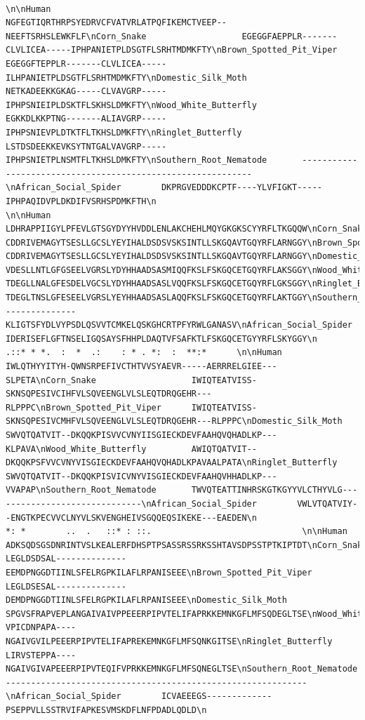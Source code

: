 \documentclass[
  letterpaper,
  DIV=11,
  numbers=noendperiod]{scrartcl}
\begin{document}
\begin{verbatim}
                                                                                  \n\nHuman                        NGFEGTIQRTHRPSYEDRVCFVATVRLATPQFIKEMCTVEEP--NEEFTSRHSLEWKFLF\nCorn_Snake                   EGEGGFAEPPLR-------CLVLICEA-----IPHPANIETPLDSGTFLSRHTMDMKFTY\nBrown_Spotted_Pit_Viper      EGEGGFTEPPLR-------CLVLICEA-----ILHPANIETPLDSGTFLSRHTMDMKFTY\nDomestic_Silk_Moth           NETKADEEKKGKAG-----CLVAVGRP-----IPHPSNIEIPLDSKTFLSKHSLDMKFTY\nWood_White_Butterfly         EGKKDLKKPTNG-------ALIAVGRP-----IPHPSNIEVPLDTKTFLTKHSLDMKFTY\nRinglet_Butterfly            LSTDSDEEKKEVKSYTNTGALVAVGRP-----IPHPSNIETPLNSMTFLTKHSLDMKFTY\nSouthern_Root_Nematode       ------------------------------------------------------------\nAfrican_Social_Spider        DKPRGVEDDDKCPTF----YLVFIGKT-----IPHPAQIDVPLDKDIFVSRHSPDMKFTH\n                                                                                         \n\nHuman                        LDHRAPPIIGYLPFEVLGTSGYDYYHVDDLENLAKCHEHLMQYGKGKSCYYRFLTKGQQW\nCorn_Snake                   CDDRIVEMAGYTSESLLGCSLYEYIHALDSDSVSKSINTLLSKGQAVTGQYRFLARNGGY\nBrown_Spotted_Pit_Viper      CDDRIVEMAGYTSESLLGCSLYEYIHALDSDSVSKSINTLLSKGQAVTGQYRFLARNGGY\nDomestic_Silk_Moth           VDESLLNTLGFGSEELVGRSLYDYHHAADSASMIQQFKSLFSKGQCETGQYRFLAKSGGY\nWood_White_Butterfly         TDEGLLNALGFESDELVGCSLYDYHHAADSASLVQQFKSLFSKGQCETGQYRFLGKSGGY\nRinglet_Butterfly            TDEGLTNSLGFESEELVGRSLYEYHHAADSASLAQQFKSLFSKGQCETGQYRFLAKTGGY\nSouthern_Root_Nematode       --------------KLIGTSFYDLVYPSDLQSVVTCMKELQSKGHCRTPFYRWLGANASV\nAfrican_Social_Spider        IDERISEFLGFTNSELIGQSAYSFHHPLDAQTVFSAFKTLFSKGQCETGYYRFLSKYGGY\n                                           .::* * *.  :  *  .:    : * . *:  :  **:*      \n\nHuman                        IWLQTHYYITYH-QWNSRPEFIVCTHTVVSYAEVR-----AERRRELGIEE---SLPETA\nCorn_Snake                   IWIQTEATVISS-SKNSQPESIVCIHFVLSQVEENGLVLSLEQTDRQGEHR---RLPPPC\nBrown_Spotted_Pit_Viper      IWIQTEATVISS-SKNSQPESIVCMHFVLSQVEENGLVLSLEQTDRQGEHR---RLPPPC\nDomestic_Silk_Moth           SWVQTQATVIT--DKQQKPISVVCVNYIISGIECKDEVFAAHQVQHADLKP---KLPAVA\nWood_White_Butterfly         AWIQTQATVIT--DKQQKPSFVVCVNYVISGIECKDEVFAAHQVQHADLKPAVAALPATA\nRinglet_Butterfly            SWVQTQATVIT--DKQQKPISVICVNYVISGIECKDEVFAAHQVHHADLKP---VVAPAP\nSouthern_Root_Nematode       TWVQTEATTINHRSKGTKGYYVLCTHYVLG------------------------------\nAfrican_Social_Spider        VWLVTQATVIY--ENGTKPECVVCLNYVLSKVENGHEIVSGQQEQSIKEKE---EAEDEN\n                              *: *        ..  .   ::* : ::.                              \n\nHuman                        ADKSQDSGSDNRINTVSLKEALERFDHSPTPSASSRSSRKSSHTAVSDPSSTPTKIPTDT\nCorn_Snake                   LEGLDSDSAL--------------EEMDPNGGDTIINLSFELRGPKILAFLRPANISEEE\nBrown_Spotted_Pit_Viper      LEGLDSESAL--------------DEMDPNGGDTIINLSFELRGPKILAFLRPANISEEE\nDomestic_Silk_Moth           SPGVSFRAPVEPLANGAIVAIVPPEEERPIPVTELIFAPRKKEMNKGFLMFSQDEGLTSE\nWood_White_Butterfly         VPICDNPAPA----NGAIVGVILPEEERPIPVTELIFAPREKEMNKGFLMFSQNKGITSE\nRinglet_Butterfly            LIRVSTEPPA----NGAIVGIVAPEEERPIPVTEQIFVPRKKEMNKGFLMFSQNEGLTSE\nSouthern_Root_Nematode       ------------------------------------------------------------\nAfrican_Social_Spider        ICVAEEEGS-------------PSEPPVLLSSTRVIFAPKESVMSKDFLNFPDADLQDLD\n                                          
\end{verbatim}
\end{document}
